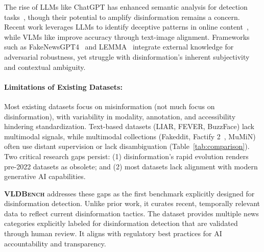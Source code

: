 The rise of LLMs like ChatGPT has enhanced semantic analysis for detection tasks~\cite{chen2023combating}, though their potential to amplify disinformation remains a concern. Recent work leverages LLMs to identify deceptive patterns in online content~\cite{jiang2024disinformation,hasanain2024gpt,huang2024fakegpt,pan2024enhancing}, while VLMs like \cite{papado2023misinformer,Qi_2024_CVPR,xuan2024lemma} improve accuracy through text-image alignment. Frameworks such as FakeNewsGPT4~\cite{liu2024fakenewsgpt4} and LEMMA~\cite{xuan2024lemma} integrate external knowledge for adversarial robustness, yet struggle with disinformation’s inherent subjectivity and contextual ambiguity.
\paragraph{Limitations of Existing Datasets:}
Most existing datasets focus on misinformation (not much focus on disinformation), with variability in modality, annotation, and accessibility hindering standardization. Text-based datasets (LIAR, FEVER, BuzzFace) lack multimodal signals, while multimodal collections (Fakeddit, Factify 2~\cite{suryavardan2023factify2multimodalfake}, MuMiN) often use distant supervision or lack disambiguation (Table~\ref{tab:comparison}). Two critical research gaps persist: (1) disinformation’s rapid evolution renders pre-2022 datasets as obsolete; and (2) most datasets lack alignment with modern generative AI capabilities.

\textsf{\textbf{\textsc{VLDBench}}} addresses these gaps as the first benchmark explicitly designed for disinformation detection. Unlike prior work, it curates recent, temporally relevant data to reflect current disinformation tactics. The dataset provides multiple news categories explicitly labeled for disinformation detection that are validated through human review.
It aligns with regulatory best practices for AI accountability and transparency.